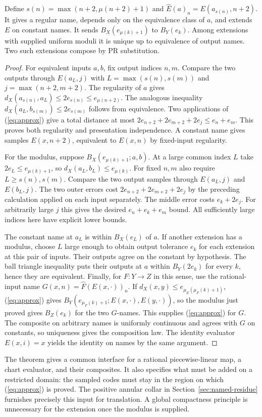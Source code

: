 \begin{theorem}\label{th:completion}
Define $s(n)=\max(n+2,\mu(n+2)+1)$ and
$\widehat E(a)_n=E(a_{s(n)},n+2)$. It gives a regular name, depends only on the equivalence class of $a$, and extends $E$ on constant names. It sends $B_X(e_{\mu(k)+1})$ to $B_Y(e_k)$. Among extensions with supplied uniform moduli it is unique up to equivalence of output names. Two such extensions compose by PR substitution.
\end{theorem}
\begin{proof}
For equivalent inputs $a,b$, fix output indices $n,m$. Compare the two outputs through $E(a_L,j)$ with $L=\max(s(n),s(m))$ and $j=\max(n+2,m+2)$. The regularity of $a$ gives $d_X(a_{s(n)},a_L)\le2e_{s(n)}\le e_{\mu(n+2)}$. The analogous inequality $d_X(a_L,b_{s(m)})\le2e_{s(m)}$ follows from equivalence. Two applications of (\ref{eq:approx}) give a total distance at most $2e_{n+2}+2e_{m+2}+2e_j\le e_n+e_m$. This proves both regularity and presentation independence. A constant name gives samples $E(x,n+2)$, equivalent to $E(x,n)$ by fixed-input regularity.

For the modulus, suppose $B_X(e_{\mu(k)+1};a,b)$. At a large common index $L$ take $2e_L\le e_{\mu(k)+1}$, so $d_X(a_L,b_L)\le e_{\mu(k)}$. For fixed $n,m$ also require $L\ge s(n),s(m)$. Compare the two output samples through $E(a_L,j)$ and $E(b_L,j)$. The two outer errors cost $2e_{n+2}+2e_{m+2}+2e_j$ by the preceding calculation applied on each input separately. The middle error costs $e_k+2e_j$. For arbitrarily large $j$ this gives the desired $e_n+e_k+e_m$ bound. All sufficiently large indices here have explicit lower bounds.

The constant name at $a_L$ is within $B_X(e_L)$ of $a$. If another extension has a modulus, choose $L$ large enough to obtain output tolerance $e_k$ for each extension at this pair of inputs. Their outputs agree on the constant by hypothesis. The ball triangle inequality puts their outputs at $a$ within $B_Y(2e_k)$ for every $k$, hence they are equivalent. Finally, for $F:Y\to Z$ in this sense, use the rational-input name $G(x,n)=\widehat F(E(x,\cdot))_n$. If $d_X(x,y)\le e_{\mu_E(\mu_F(k)+1)}$, (\ref{eq:approx}) gives $B_Y(e_{\mu_F(k)+1};E(x,\cdot),E(y,\cdot))$, so the modulus just proved gives $B_Z(e_k)$ for the two $G$-names. This supplies (\ref{eq:approx}) for $G$. The composite on arbitrary names is uniformly continuous and agrees with $G$ on constants, so uniqueness gives the composition law. The identity evaluator $E(x,i)=x$ yields the identity on names by the same argument.
\end{proof}

The theorem gives a common interface for a rational piecewise-linear map, a chart evaluator, and their composites. It also specifies what must be added on a restricted domain: the sampled codes must stay in the region on which (\ref{eq:approx}) is proved. The positive annular collar in Section~\ref{sec:named-residue} furnishes precisely this input for translation. A global compactness principle is unnecessary for the extension once the modulus is supplied.
